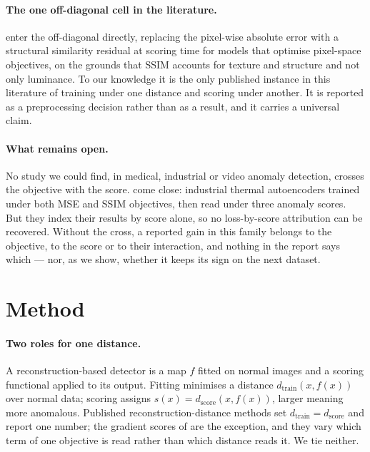 \documentclass[pmlr,twocolumn,10pt]{jmlr} %
\begin{document}
\paragraph*{The one off-diagonal cell in the literature.}
\citet{lagogiannis2024unsupervised} enter the off-diagonal directly, replacing the
pixel-wise absolute error with a structural similarity residual at scoring time for models
that optimise pixel-space objectives, on the grounds that SSIM accounts for texture and
structure and not only luminance. To our knowledge it is the only published instance in this
literature of training under one distance and scoring under another. It is reported as a
preprocessing decision rather than as a result, and it carries a universal claim.

\paragraph*{What remains open.}
No study we could find, in medical, industrial or video anomaly detection, crosses the
objective with the score. \citet{behrouzi2023anomaly} come close: industrial thermal
autoencoders trained under both MSE and SSIM objectives, then read under three anomaly
scores. But they index their results by score alone, so no loss-by-score attribution can be
recovered. Without the cross, a reported gain in this family belongs to the objective, to
the score or to their interaction, and nothing in the report says which --- nor, as we show,
whether it keeps its sign on the next dataset.

\section{Method}
\label{sec:method}

\paragraph*{Two roles for one distance.}
A reconstruction-based detector is a map $f$ fitted on normal images and a scoring
functional applied to its output. Fitting minimises a distance
$d_{\mathrm{train}}(x, f(x))$ over normal data; scoring assigns
$s(x) = d_{\mathrm{score}}(x, f(x))$, larger meaning more anomalous. Published reconstruction-distance methods set $d_{\mathrm{train}} = d_{\mathrm{score}}$ and
report one number; the gradient scores of \citet{zimmerer2019unsupervised} are the exception,
and they vary which term of one objective is read rather than which distance reads it. We
tie neither.
\end{document}

